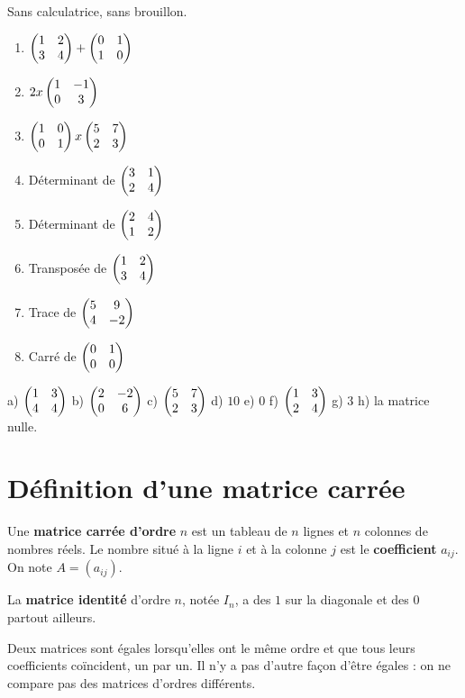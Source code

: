 \begin{automatismes}
Sans calculatrice, sans brouillon.

\begin{enumerate}[label=\textbf{\alph*)}, leftmargin=*, itemsep=0.25em]
  \item $\begin{pmatrix} 1 & 2 \\ 3 & 4 \end{pmatrix}+\begin{pmatrix} 0 & 1 \\ 1 & 0 \end{pmatrix}$
  \item $2 x \begin{pmatrix} 1 & -1 \\ 0 & 3 \end{pmatrix}$
  \item $\begin{pmatrix} 1 & 0 \\ 0 & 1 \end{pmatrix} x \begin{pmatrix} 5 & 7 \\ 2 & 3 \end{pmatrix}$
  \item Déterminant de $\begin{pmatrix} 3 & 1 \\ 2 & 4 \end{pmatrix}$
  \item Déterminant de $\begin{pmatrix} 2 & 4 \\ 1 & 2 \end{pmatrix}$
  \item Transposée de $\begin{pmatrix} 1 & 2 \\ 3 & 4 \end{pmatrix}$
  \item Trace de $\begin{pmatrix} 5 & 9 \\ 4 & -2 \end{pmatrix}$
  \item Carré de $\begin{pmatrix} 0 & 1 \\ 0 & 0 \end{pmatrix}$
\end{enumerate}
\end{automatismes}

\begin{corrige}[automatismes]
a) $\begin{pmatrix} 1 & 3 \\ 4 & 4 \end{pmatrix}$ \quad b) $\begin{pmatrix} 2 & -2 \\ 0 & 6 \end{pmatrix}$ \quad
c) $\begin{pmatrix} 5 & 7 \\ 2 & 3 \end{pmatrix}$ \quad d) $10$ \quad e) $0$ \quad
f) $\begin{pmatrix} 1 & 3 \\ 2 & 4 \end{pmatrix}$ \quad g) $3$ \quad h) la matrice nulle.
\end{corrige}

\section{Définition d'une matrice carrée}

\begin{definition}
Une \textbf{matrice carrée d'ordre} $n$ est un tableau de $n$ lignes et $n$
colonnes de nombres réels. Le nombre situé à la ligne $i$ et à la colonne $j$
est le \textbf{coefficient} $a_{ij}$. On note $A = (a_{ij})$.

La \textbf{matrice identité} d'ordre $n$, notée $I_{n}$, a des $1$ sur la
diagonale et des $0$ partout ailleurs.
\end{definition}

\begin{remarque}
Deux matrices sont égales lorsqu'elles ont le même ordre et que tous leurs
coefficients coïncident, un par un. Il n'y a pas d'autre façon d'être égales :
on ne compare pas des matrices d'ordres différents.
\end{remarque}

